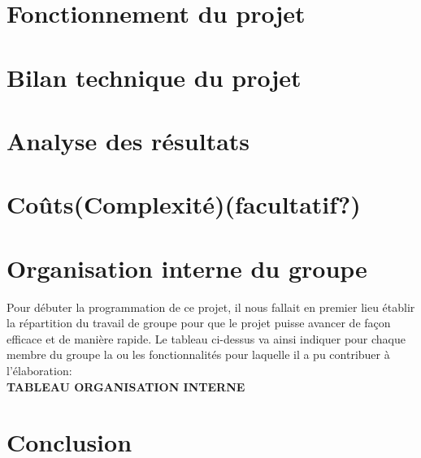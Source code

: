 		
	\section{Fonctionnement du projet}

	\section{Bilan technique du projet}
	
	\section{Analyse des résultats}
	
	\section{Coûts(Complexité)(facultatif?)}
					
	\section{Organisation interne du groupe}
	Pour débuter la programmation de ce projet, il nous fallait en premier lieu établir la répartition du travail de groupe pour que le projet puisse avancer de façon efficace et de manière rapide. Le tableau ci-dessus va ainsi indiquer pour chaque membre du groupe la ou les fonctionnalités pour laquelle il a pu contribuer à l'élaboration: \\
	
	\textbf{TABLEAU ORGANISATION INTERNE}

	\section{Conclusion}

